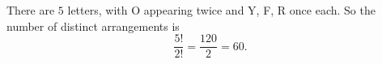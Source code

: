 There are $5$ letters, with O appearing twice and Y, F, R once each. So the number of distinct arrangements is
\[\dfrac{5!}{2!}=\dfrac{120}{2}=\boxed{60}.\]
